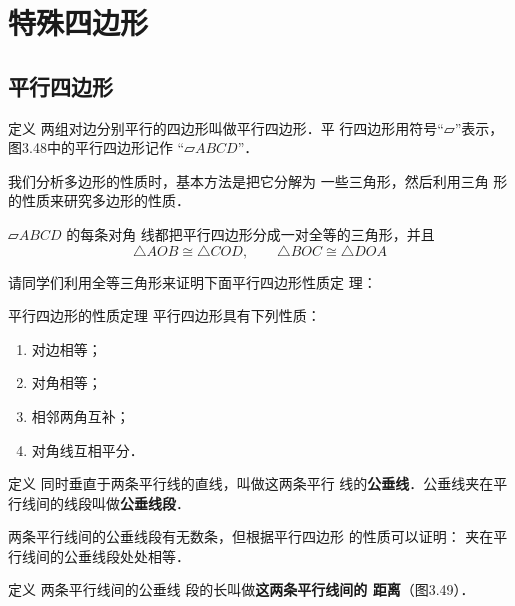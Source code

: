 \section{特殊四边形}
\subsection{平行四边形}
\begin{blk}{定义}
两组对边分别平行的四边形叫做平行四边形．平
行四边形用符号“$\parallelogram$”表示，图3.48中的平行四边形记作
“$\parallelogram ABCD$”．
\end{blk}


我们分析多边形的性质时，基本方法是把它分解为
一些三角形，然后利用三角
形的性质来研究多边形的性质．

$\parallelogram ABCD$ 的每条对角
线都把平行四边形分成一对全等的三角形，并且
\[\triangle AOB\cong \triangle COD,\qquad \triangle BOC\cong \triangle DOA\]

请同学们利用全等三角形来证明下面平行四边形性质定
理：

\begin{blk}
    {平行四边形的性质定理}
平行四边形具有下列性质：
\begin{enumerate}
    \item 对边相等；
    \item 对角相等；
    \item 相邻两角互补；
    \item 对角线互相平分．
\end{enumerate}
\end{blk}

\begin{blk}
    {定义} 同时垂直于两条平行线的直线，叫做这两条平行
线的\textbf{公垂线}．公垂线夹在平行线间的线段叫做\textbf{公垂线段}．
\end{blk}

两条平行线间的公垂线段有无数条，但根据平行四边形
的性质可以证明：
夹在平行线间的公垂线段处处相等．


\begin{blk}
    {定义} 两条平行线间的公垂线
段的长叫做\textbf{这两条平行线间的
距离}（图3.49）．
\end{blk}

\begin{figure}[htp]
    \centering
{}
    \caption{}
\end{figure}



